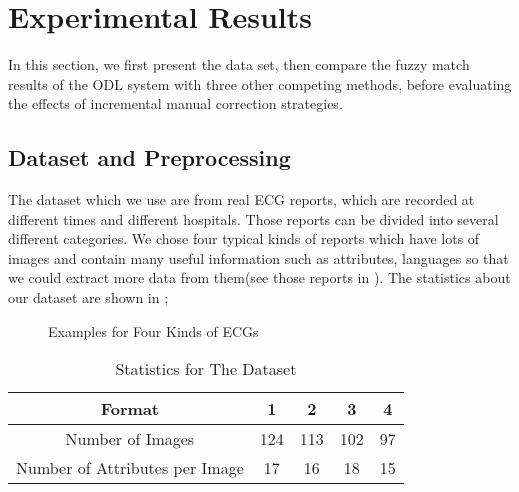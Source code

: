\section{Experimental Results}
\label{sec:eval}
In this section, we first present the data set, 
then compare the fuzzy match results
of the ODL system with three other competing methods, before evaluating the
effects of incremental manual correction strategies.

\subsection{Dataset and Preprocessing}
The dataset which we use are from real ECG reports, which are recorded at different times and different hospitals. Those reports can be divided into several different categories. We chose four typical kinds of reports which have lots of images and contain many useful information such as attributes, languages so that we could extract more data from them(see those reports in ).
The statistics about our dataset are 
shown in ; 

\begin{figure}[ht]
\centering
{}
{}
\hfill
{}
\caption{Examples for Four Kinds of ECGs}
\label{fig:dataset}
\end{figure}

\begin{table}[!hbp]
\centering
\caption{Statistics for The Dataset}
\label{tab:statis}
\begin{tabular}{|c|c|c|c|c|}
\hline
Format & 1 & 2 & 3 & 4\\
\hline \hline
Number of Images & 124 & 113 & 102 & 97\\ 
\hline
Number of Attributes per Image & 17 & 16 & 18 & 15 \\
\hline
\end{tabular}
\end{table}


